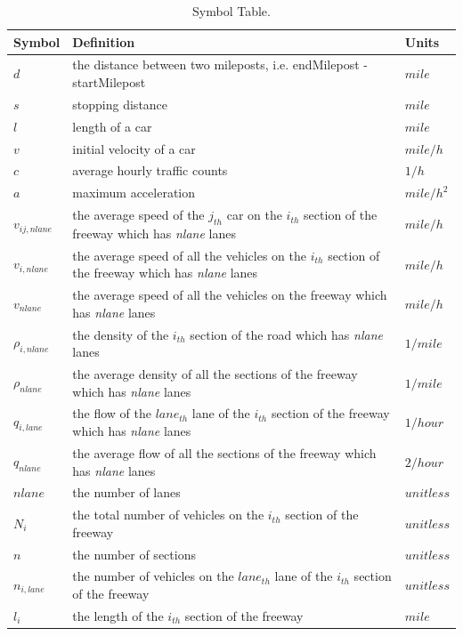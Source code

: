 \documentclass[a4paper]{article}
\begin{document}
    \begin{table}[H]
    \centering
    \begin{tabular}{lll}
    \toprule
		Symbol & Definition & Units \\
		\midrule
$d$   & the distance between two mileposts, i.e. endMilepost - startMilepost & $mile$ \\
$s$   & stopping distance & $mile$ \\
$l$   & length of a car & $mile$ \\
$v$   & initial velocity of a car & $mile/h$ \\
$c$   & average hourly traffic counts & $1/h$ \\
$a$   & maximum acceleration & $mile/h^2$ \\
$v_{ij,nlane}$ & the average speed of the $j_{th}$ car on the $i_{th}$ section of the freeway which has \textit{nlane} lanes & $mile/h$ \\
$v_{i,nlane}$ & the average speed of all the vehicles on the $i_{th}$ section of the freeway which has \textit{nlane} lanes & $mile/h$ \\
$v_{nlane}$ & the average speed of all the vehicles on the freeway which has \textit{nlane} lanes & $mile/h$ \\
$\rho_{i,nlane}$ & the density of the $i_{th}$ section of the road which has \textit{nlane} lanes & $1/mile$ \\
$\rho_{nlane}$ & the average density of all the sections of the freeway which has \textit{nlane} lanes & $1/mile$ \\
$q_{i,lane}$ & the flow of the $lane_{th}$ lane of the $i_{th}$ section of the freeway which has \textit{nlane} lanes & $1/hour$ \\
$q_{nlane}$ & the average flow of all the sections of the freeway which has \textit{nlane} lanes & $2/hour$ \\
$nlane$ & the number of lanes & $unitless$ \\
${N_i}$ & the total number of vehicles on the $i_{th}$ section of the freeway & $unitless$ \\
$n$   & the number of sections & $unitless$ \\
$n_{i,lane}$ & the number of vehicles on the $lane_{th}$ lane of the $i_{th}$ section of the freeway & $unitless$ \\
$l_i$ & the length of the $i_{th}$ section of the freeway & $mile$ \\
    \bottomrule
    \end{tabular}
    \caption{Symbol Table.}
    \label{t1}
    \end{table}
\end{document}
